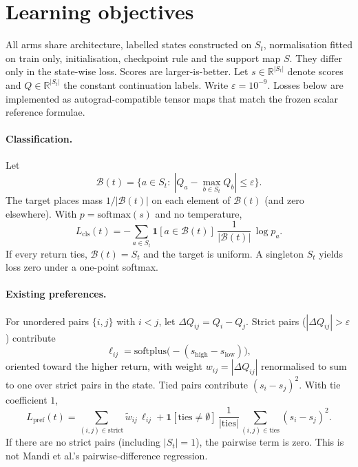 \section{Learning objectives}

All arms share architecture, labelled states constructed on $S_t$, normalisation
fitted on train only, initialisation, checkpoint rule and the support map $S$.
They differ only in the state-wise loss. Scores are larger-is-better. Let
$s\in\mathbb{R}^{|S_t|}$ denote scores and $Q\in\mathbb{R}^{|S_t|}$ the constant
continuation labels. Write $\varepsilon=10^{-9}$. Losses below are implemented as
autograd-compatible tensor maps that match the frozen scalar reference formulae.

\paragraph{Classification.}
Let
\begin{equation}
  \mathcal{B}(t)=\bigl\{a\in S_t:\ |Q_a-\max_{b\in S_t}Q_b|\le\varepsilon\bigr\}.
\end{equation}
The target places mass $1/|\mathcal{B}(t)|$ on each element of $\mathcal{B}(t)$
(and zero elsewhere). With $p=\mathrm{softmax}(s)$ and no temperature,
\begin{equation}
  L_{\mathrm{cls}}(t)=-\sum_{a\in S_t} \mathbf{1}[a\in\mathcal{B}(t)]\,\frac{1}{|\mathcal{B}(t)|}\,\log p_a.
\end{equation}
If every return ties, $\mathcal{B}(t)=S_t$ and the target is uniform. A singleton
$S_t$ yields loss zero under a one-point softmax.

\paragraph{Existing preferences.}
For unordered pairs $\{i,j\}$ with $i<j$, let $\Delta Q_{ij}=Q_i-Q_j$. Strict pairs
($|\Delta Q_{ij}|>\varepsilon$) contribute
\begin{equation}
  \ell_{ij}=\mathrm{softplus}\bigl(-(s_{\mathrm{high}}-s_{\mathrm{low}})\bigr),
\end{equation}
oriented toward the higher return, with weight $w_{ij}=|\Delta Q_{ij}|$ renormalised
to sum to one over strict pairs in the state. Tied pairs contribute
$(s_i-s_j)^2$. With tie coefficient $1$,
\begin{equation}
  L_{\mathrm{pref}}(t)
  =
  \sum_{(i,j)\in\mathrm{strict}} \tilde w_{ij}\,\ell_{ij}
  +
  \mathbf{1}[\mathrm{ties}\neq\emptyset]\,
  \frac{1}{|\mathrm{ties}|}\sum_{(i,j)\in\mathrm{ties}}(s_i-s_j)^2.
\end{equation}
If there are no strict pairs (including $|S_t|=1$), the pairwise term is zero. This
is not Mandi et al.'s pairwise-difference regression.

